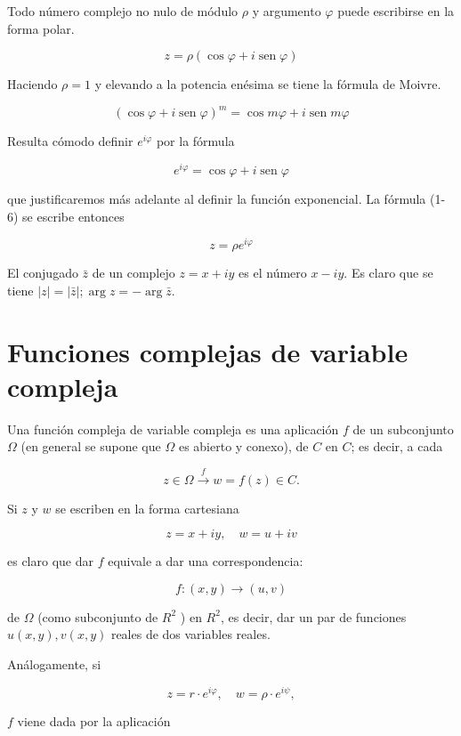 \documentclass[10pt]{article}
\theoremstyle{plain}
\theoremstyle{definition}
\theoremstyle{remark}
\begin{document}
Todo número complejo no nulo de módulo $\rho$ y argumento $\varphi$ puede escribirse en la forma polar.


\begin{equation*}
z=\rho(\cos \varphi+i \operatorname{sen} \varphi) \tag{1.6}
\end{equation*}


Haciendo $\rho=1$ y elevando a la potencia enésima se tiene la fórmula de Moivre.


\begin{equation*}
(\cos \varphi+i \operatorname{sen} \varphi)^{m}=\cos m \varphi+i \operatorname{sen} m \varphi \tag{1.7}
\end{equation*}


Resulta cómodo definir $e^{i \varphi}$ por la fórmula

$$
e^{i \varphi}=\cos \varphi+i \operatorname{sen} \varphi
$$

que justificaremos más adelante al definir la función exponencial. La fórmula (1-6) se escribe entonces

$$
z=\rho e^{i \varphi}
$$

El conjugado $\bar{z}$ de un complejo $z=x+i y$ es el número $x-i y$. Es claro que se tiene $|z|=|\bar{z}| ; \arg z=-\arg \bar{z}$.

\section{Funciones complejas de variable compleja}
Una función compleja de variable compleja es una aplicación $f$ de un subconjunto $\Omega$ (en general se supone que $\Omega$ es abierto y conexo), de $C$ en $C$; es decir, a cada

$$
z \in \Omega \xrightarrow{f} w=f(z) \in C .
$$

Si $z$ y $w$ se escriben en la forma cartesiana

$$
z=x+i y, \quad w=u+i v
$$

es claro que dar $f$ equivale a dar una correspondencia:

$$
f:(x, y) \rightarrow(u, v)
$$

de $\Omega$ (como subconjunto de $R^{2}$ ) en $R^{2}$, es decir, dar un par de funciones $u(x, y), v(x, y)$ reales de dos variables reales.

Análogamente, si

$$
z=r \cdot e^{i \varphi}, \quad w=\rho \cdot e^{i \psi},
$$

$f$ viene dada por la aplicación
\end{document}
